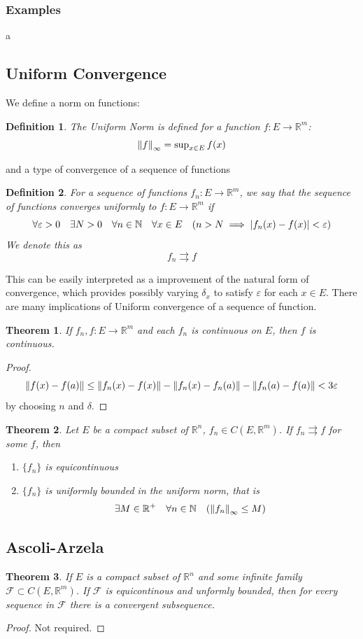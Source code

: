 \documentclass[a4paper, 12pt]{book}
\newtheorem{definition}{Definition}[chapter]
\newtheorem{theorem}{Theorem}[chapter]
\begin{document}
\subsubsection{Examples}
a
\subsection{Uniform Convergence}
We define a norm on functions:
\begin{definition}
	The Uniform Norm is defined for a function \( f:E\to \mathbb{R}^m \):
	\[
		\norm{f} _\infty =\operatorname{sup}_{x\in E} f(x)
	\]
\end{definition}
and a type of convergence of a sequence of functions
\begin{definition}
	For a sequence of functions \( f_n: E\to \mathbb{R}^m \), we say that the sequence of functions converges uniformly to \( f:E\to \mathbb{R}^m \) if
	\[
		\forall \varepsilon>0 \quad \exists N >0 \quad \forall n \in\mathbb{N} \quad \forall x \in E \quad (n>N \implies \abs{f_n(x)-f(x)}<\varepsilon)
	\]
	We denote this as \[
		f_n \rightrightarrows f
	\]
\end{definition}
This can be easily interpreted as a improvement of the natural form of convergence, which provides possibly varying \( \delta_x \) to satisfy \( \varepsilon \) for each \( x\in E \). There are many implications of Uniform convergence of a sequence of function.
\begin{theorem}
	If \( f_n, f:E\to \mathbb{R}^m \) and each \( f_n \) is continuous on \( E \), then \( f \) is continuous.
\end{theorem}
\begin{proof}
	\[
		\norm{f(x)-f(a)}\leq \norm{f_n(x)-f(x)} -\norm{f_n(x)-f_n(a)} -\norm{f_n(a)-f(a)}< 3 \varepsilon
	\]
	by choosing \( n \) and \( \delta \).
\end{proof}
\begin{theorem}
	Let \( E \) be a compact subset of \( \mathbb{R}^n \), \( f_n\in C(E,\mathbb{R}^m) \). If \( f_n \rightrightarrows f \) for some \( f \), then
	\begin{enumerate}
		\item \( \{f_n\} \) is equicontinuous
		\item \( \{f_n\} \) is uniformly bounded in the uniform norm, that is \[
			      \exists M\in \mathbb{R}^+ \quad \forall n \in \mathbb{N} \quad (\norm{f_n}_\infty \leq M)
		      \]
	\end{enumerate}
\end{theorem}
\subsection{Ascoli-Arzela}
\begin{theorem}
	If \( E \) is a compact subset of \( \mathbb{R}^n \) and some infinite family \( \mathcal{F} \subset C(E,\mathbb{R}^m) \). If \( \mathcal{F} \) is equicontinous and unformly bounded, then for every sequence in \( \mathcal{F} \) there is a convergent subsequence.
\end{theorem}
\begin{proof}
	Not required.
\end{proof}
\end{document}
